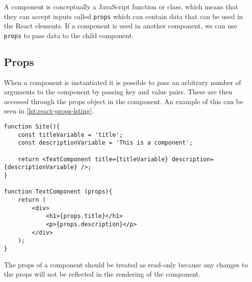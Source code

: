 A component is conceptually a JavaScript function or class, which means that they can accept inputs called \texttt{props} which can contain data that can be used in the React elements.
If a component is used in another component, we can use \texttt{props} to pass data to the child component.
\subsection*{Props}
When a component is instantiated it is possible to pass an arbitrary number of arguments to the component by passing key and value pairs.
These are then accessed through the props object in the component.
An example of this can be seen in \autoref{lst:react-props-lsting}.

\begin{lstlisting}[caption={An example of how properties are passed to children components}, label={lst:react-props-lsting}]
function Site(){
	const titleVariable = 'title';
	const descriptionVariable = 'This is a component';

	return <TextComponent title={titleVariable} description={descriptionVariable} />;
}

function TextComponent (props){
	return (
		<div>
			<h1>{props.title}</h1>
			<p>{props.description}</p>
		</div>
	);
}
\end{lstlisting}

The props of a component should be treated as read-only because any changes to the props will not be reflected in the rendering of the component.

